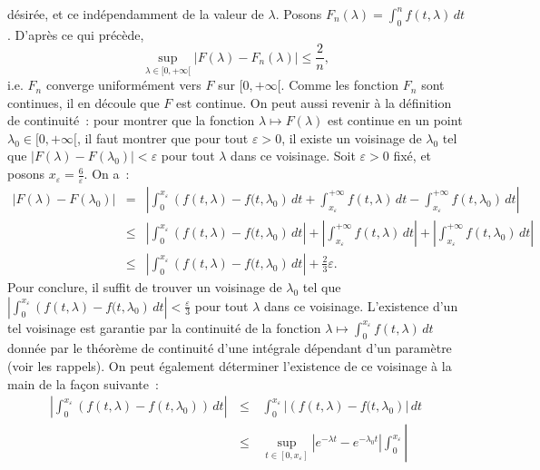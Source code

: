 {\begin{enumerate}
{d\'esir\'ee, et ce ind\'ependamment de la valeur de $\lambda$.
Posons $F_{n}(\lambda) = \int_{0}^{n}f(t, \lambda) \,dt$.
D'apr\`es ce qui pr\'ec\`ede,
$$
\sup_{\lambda\in [0,+\infty[} |F(\lambda) - F_{n}(\lambda)| \leq
\frac{2}{n},
$$
i.e. $F_{n}$ converge uniform\'ement vers $F$ sur $[0, +\infty[$.
Comme les fonction $F_{n}$ sont continues, il en d\'ecoule que $F$
est continue. On peut aussi revenir \`a la d\'efinition de
continuit\'e~:
 pour montrer que la fonction $\lambda \mapsto F(\lambda)$
est continue en un point $\lambda_{0} \in [0, +\infty[$, il faut
montrer que pour tout $\varepsilon>0$, il existe un voisinage de
${\lambda}_{0}$ tel que $|F(\lambda) - F({\lambda}_{0})| <
\varepsilon$ pour tout $\lambda $ dans ce voisinage. Soit
$\varepsilon>0$ fix\'e, et posons $x_{\varepsilon} =
\frac{6}{\varepsilon}$. On a~:
\begin{eqnarray*}
|F(\lambda) - F({\lambda}_{0})| &=&
\left|\int_{0}^{x_{\varepsilon}} \left(f(t, \lambda) - f(t,
{\lambda}_{0}\right)\,dt + \int_{x_{\varepsilon}}^{+\infty} f(t,
\lambda)\, dt - \int_{x_{\varepsilon}}^{+\infty} f(t,
{\lambda}_{0})\,dt
\right|\\
&\leq & \left|\int_{0}^{x_{\varepsilon}} \left(f(t, \lambda) -
f(t, {\lambda}_{0}\right)\,dt\right| + \left|
\int_{x_{\varepsilon}}^{+\infty} f(t, \lambda)\, dt \right| +
\left| \int_{x_{\varepsilon}}^{+\infty} f(t,
{\lambda}_{0})\,dt \right|\\
& \leq & \left|\int_{0}^{x_{\varepsilon}} \left(f(t, \lambda) -
f(t, {\lambda}_{0}\right)\,dt \right|+ \frac{2}{3}\varepsilon.
\end{eqnarray*}
Pour conclure, il suffit de trouver un voisinage de ${\lambda}_0$
tel que  $\left|\int_{0}^{x_{\varepsilon}} \left(f(t, \lambda) -
f(t, {\lambda}_{0}\right)\,dt\right| < \frac{\varepsilon}{3}$ pour
tout $\lambda $ dans ce voisinage. L'existence d'un tel voisinage
est garantie par la continuit\'e de la fonction $\lambda \mapsto
\int_{0}^{x_{\varepsilon}}f(t, \lambda)\,dt$ donn\'ee par le
th\'eor\`eme de continuit\'e d'une int\'egrale d\'ependant d'un param\`etre (voir les rappels).
On peut \'egalement d\'eterminer
l'existence de ce voisinage \`a la main de la fa\c{c}on suivante~:
\begin{eqnarray*}
\left|\int_{0}^{x_{\varepsilon}} \left(f(t, \lambda) - f(t,
{\lambda}_{0})\right)\,dt\right| &\,\leq\,&
\int_{0}^{x_{\varepsilon}}
\left|\left(f(t, \lambda) - f(t, {\lambda}_{0}\right)\right|\,dt\\
&\,\leq \,& \sup_{t\in [0, x_{\varepsilon}]} \left| e^{-\lambda t}
- e^{-{\lambda}_0 t}\right| \int_{0}^{x_{\varepsilon}} \left|

\end{eqnarray*}}
\end{enumerate}}
